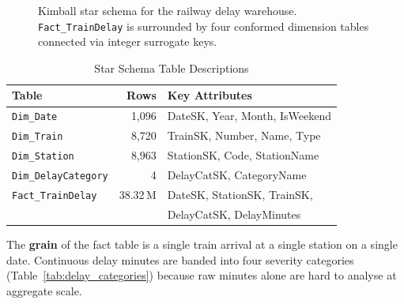 \documentclass[conference]{IEEEtran}
\begin{document}
\begin{figure}[htbp]
  \centering
  \caption{Kimball star schema for the railway delay warehouse.
           \texttt{Fact\_TrainDelay} is surrounded by four conformed
           dimension tables connected via integer surrogate keys.}
  \label{fig:schema}
\end{figure}

\begin{table}[htbp]
  \caption{Star Schema Table Descriptions}
  \label{tab:schema_tables}
  \begin{center}
    \begin{tabular}{|l|r|l|}
      \hline
      \textbf{Table} & \textbf{Rows} & \textbf{Key Attributes} \\
      \hline
      \texttt{Dim\_Date}          & 1,096     & DateSK, Year, Month, IsWeekend \\
      \texttt{Dim\_Train}         & 8,720     & TrainSK, Number, Name, Type \\
      \texttt{Dim\_Station}       & 8,963     & StationSK, Code, StationName \\
      \texttt{Dim\_DelayCategory} & 4         & DelayCatSK, CategoryName \\
      \texttt{Fact\_TrainDelay}   & 38.32\,M  & DateSK, StationSK, TrainSK, \\
                                  &           & DelayCatSK, DelayMinutes \\
      \hline
    \end{tabular}
  \end{center}
\end{table}

The \textbf{grain} of the fact table is a single train arrival at a single
station on a single date.
Continuous delay minutes are banded into four severity categories
(Table~\ref{tab:delay_categories}) because raw minutes alone are hard to
analyse at aggregate scale.
\end{document}
